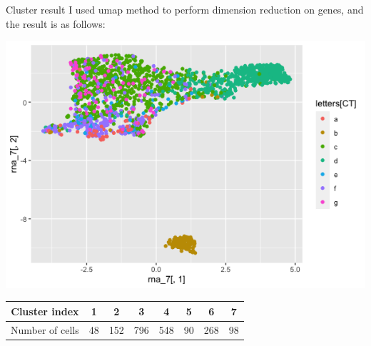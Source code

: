 \documentclass[10 pt]{beamer}
\begin{document}
\begin{frame}{Cluster result}
I used umap method to perform dimension reduction on genes, and the result is as follows:
~\\
\centerline{\includegraphics[scale=0.4]{pic/umap.png}}
\begin{table}
	\begin{tabular}{c|c|c|c|c|c|c|c}
		\hline
Cluster index &1&2  & 3  & 4 &  5  & 6 &  7 \\
\hline
 Number of cells& 48& 152& 796 &548 & 90 &268&  98 \\
		\hline
		
	\end{tabular}
\end{table}
\end{frame}
\end{document}
